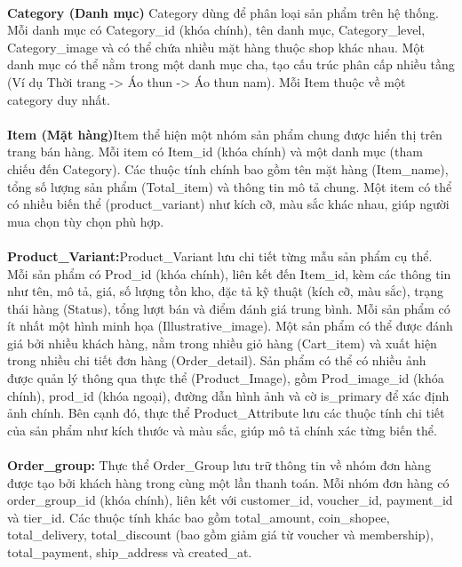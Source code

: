 \\
\hspace*{2em} \textbf{Category (Danh mục)} Category dùng để phân loại sản phẩm trên hệ thống. Mỗi danh mục có Category\_id (khóa chính), tên danh mục, Category\_level, Category\_image và có thể chứa nhiều mặt hàng thuộc shop khác nhau. Một danh mục có thể nằm trong một danh mục cha, tạo cấu trúc phân cấp nhiều tầng (Ví dụ Thời trang -> Áo thun -> Áo thun nam). Mỗi Item thuộc về một category duy nhất.\\ \\ 
\hspace*{2em} \textbf{Item (Mặt hàng)}Item thể hiện một nhóm sản phẩm chung được hiển thị trên trang bán hàng. 
Mỗi item có Item\_id (khóa chính) và một danh mục (tham chiếu đến Category). 
Các thuộc tính chính bao gồm tên mặt hàng (Item\_name), tổng số lượng sản phẩm (Total\_item) và thông tin mô tả chung. 
Một item có thể có nhiều biến thể (product\_variant) như kích cỡ, màu sắc khác nhau, 
giúp người mua chọn tùy chọn phù hợp. \\ \\ 
\hspace*{2em} \textbf{Product\_Variant:}Product\_Variant lưu chi tiết từng mẫu sản phẩm cụ thể. Mỗi sản phẩm có Prod\_id (khóa chính), 
liên kết đến Item\_id, kèm các thông tin như tên, mô tả, giá, số lượng tồn kho, đặc tả kỹ thuật (kích cỡ, màu sắc), 
trạng thái hàng (Status), tổng lượt bán và điểm đánh giá trung bình. Mỗi sản phẩm có ít nhất một hình minh họa (Illustrative\_image). 
Một sản phẩm có thể được đánh giá bởi nhiều khách hàng, nằm trong nhiều giỏ hàng (Cart\_item) và xuất hiện trong nhiều chi tiết đơn hàng (Order\_detail).
Sản phẩm có thể có nhiều ảnh được quản lý thông qua thực thể (Product\_Image), gồm Prod\_image\_id (khóa chính), prod\_id (khóa ngoại), đường dẫn hình ảnh và cờ is\_primary để xác định ảnh chính. Bên cạnh đó, 
thực thể Product\_Attribute lưu các thuộc tính chi tiết của sản phẩm như kích thước và màu sắc, giúp mô tả chính xác từng biến thể.
 \\ \\
\hspace*{2em} \textbf{Order\_group:} Thực thể Order\_Group lưu trữ thông tin về nhóm đơn hàng được tạo bởi khách hàng trong cùng một lần thanh toán. 
Mỗi nhóm đơn hàng có order\_group\_id (khóa chính), liên kết với customer\_id, voucher\_id, payment\_id và tier\_id. Các thuộc tính khác bao gồm total\_amount, coin\_shopee, total\_delivery, 
total\_discount (bao gồm giảm giá từ voucher và membership), total\_payment, ship\_address và created\_at.

